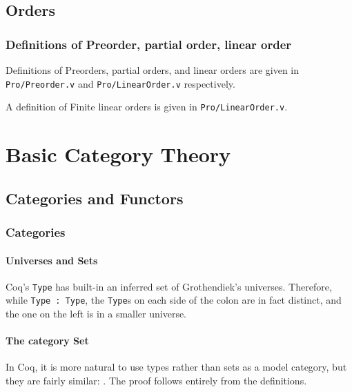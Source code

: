 \documentclass[12pt,twocolumn,oneside]{book}
\begin{document}
\section{Orders}
\subsection{Definitions of Preorder, partial order, linear order}
Definitions of Preorders, partial orders, and linear orders are given in \texttt{Pro/Preorder.v}
and \texttt{Pro/LinearOrder.v} respectively.

A definition of Finite linear orders is given in \texttt{Pro/LinearOrder.v}.

\chapter{Basic Category Theory}


\section{Categories and Functors}

\subsection{Categories}


\subsubsection{Universes and Sets}

Coq's \texttt{Type} has built-in an inferred set of Grothendiek's universes. Therefore,
while \texttt{Type : Type}, the \texttt{Type}s on each side of the colon are in fact
distinct, and the one on the left is in a smaller universe.

\subsubsection{The category \textbf{Set}}

In Coq, it is more natural to use types rather than sets as a model category, but
they are fairly similar: . The proof follows entirely
from the definitions.
\end{document}
